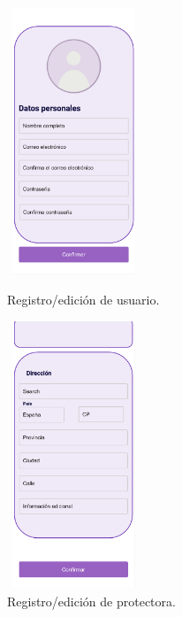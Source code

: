 \documentclass[a4paper, 12pt]{article}
\begin{document}
\begin{figure}[H]
   	\begin{minipage}{0.48\textwidth}
		\begin{center}
			{\includegraphics[height=8cm, width=4cm]{UserRegister.jpg}\par}
			\caption{Registro/edición de usuario.}
			\medskip
		\end{center}  
	\end{minipage}\hfill
   	\begin{minipage}{0.48\textwidth}
		\begin{center}
			{\includegraphics[height=8cm, width=4cm]{CompanyRegister.jpg}\par}
			\caption{Registro/edición de protectora.}
			\medskip
		\end{center}  
	\end{minipage}\hfill
\end{figure}
\end{document}
